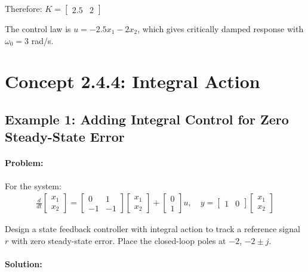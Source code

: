 \documentclass[11pt,a4paper]{article}
\begin{document}
Therefore: $K = \begin{bmatrix} 2.5 & 2 \end{bmatrix}$

The control law is $u = -2.5x_1 - 2x_2$, which gives critically damped response with $\omega_0 = 3$ rad/s.

\section{Concept 2.4.4: Integral Action}

\subsection{Example 1: Adding Integral Control for Zero Steady-State Error}

\paragraph{Problem:} For the system:
\begin{align}
\frac{d}{dt}\begin{bmatrix} x_1 \\ x_2 \end{bmatrix} = \begin{bmatrix} 0 & 1 \\ -1 & -1 \end{bmatrix}\begin{bmatrix} x_1 \\ x_2 \end{bmatrix} + \begin{bmatrix} 0 \\ 1 \end{bmatrix}u, \quad y = \begin{bmatrix} 1 & 0 \end{bmatrix}\begin{bmatrix} x_1 \\ x_2 \end{bmatrix}
\end{align}

Design a state feedback controller with integral action to track a reference signal $r$ with zero steady-state error. Place the closed-loop poles at $-2$, $-2 \pm j$.

\paragraph{Solution:}
\end{document}
